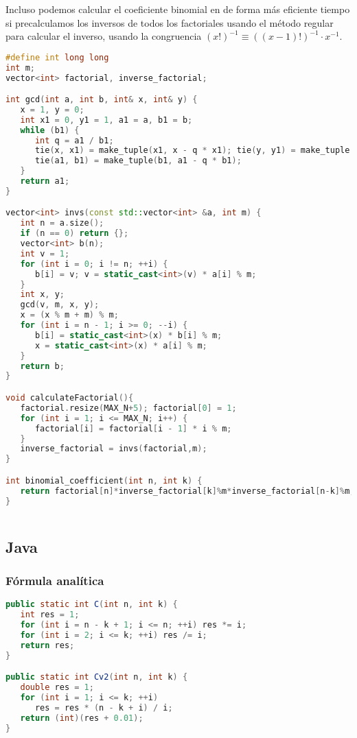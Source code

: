 Incluso podemos calcular el coeficiente binomial en de forma más eficiente tiempo si precalculamos los inversos de todos los factoriales usando el método regular para calcular el 
inverso, usando la congruencia $(x!)^{-1} \equiv ((x-1)!)^{-1} \cdot x^{-1}$.

\begin{lstlisting}[language=C++]
#define int long long
int m;
vector<int> factorial, inverse_factorial;

int gcd(int a, int b, int& x, int& y) {
   x = 1, y = 0;
   int x1 = 0, y1 = 1, a1 = a, b1 = b;
   while (b1) {
      int q = a1 / b1;
      tie(x, x1) = make_tuple(x1, x - q * x1); tie(y, y1) = make_tuple(y1, y - q * y1);
      tie(a1, b1) = make_tuple(b1, a1 - q * b1);
   }
   return a1;
}

vector<int> invs(const std::vector<int> &a, int m) {
   int n = a.size();
   if (n == 0) return {};
   vector<int> b(n);
   int v = 1;
   for (int i = 0; i != n; ++i) {
      b[i] = v; v = static_cast<int>(v) * a[i] % m;
   }
   int x, y;
   gcd(v, m, x, y);
   x = (x % m + m) % m;
   for (int i = n - 1; i >= 0; --i) {
      b[i] = static_cast<int>(x) * b[i] % m;
      x = static_cast<int>(x) * a[i] % m;
   }
   return b;
}

void calculateFactorial(){
   factorial.resize(MAX_N+5); factorial[0] = 1;
   for (int i = 1; i <= MAX_N; i++) {
      factorial[i] = factorial[i - 1] * i % m;
   }
   inverse_factorial = invs(factorial,m);
}

int binomial_coefficient(int n, int k) {
   return factorial[n]*inverse_factorial[k]%m*inverse_factorial[n-k]%m;
}
	
\end{lstlisting}

\subsection{Java}

\subsubsection{Fórmula analítica}
\begin{lstlisting}[language=Java]
public static int C(int n, int k) {
   int res = 1;
   for (int i = n - k + 1; i <= n; ++i) res *= i;
   for (int i = 2; i <= k; ++i) res /= i;
   return res;
}

public static int Cv2(int n, int k) {
   double res = 1;
   for (int i = 1; i <= k; ++i)
      res = res * (n - k + i) / i;
   return (int)(res + 0.01);
}	
\end{lstlisting}

